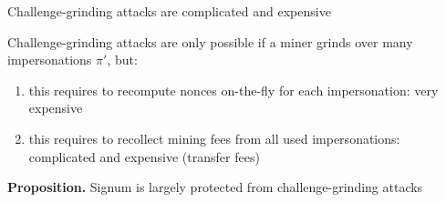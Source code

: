 \documentclass[11pt]{beamer}  %
\begin{document}
\begin{frame}{Challenge-grinding attacks are complicated and expensive}

  \begin{center}
  \end{center}

  Challenge-grinding attacks are only possible if a miner grinds over many impersonations $\pi'$, but:

  \begin{enumerate}
    \pause
  \item this requires to recompute nonces on-the-fly for each impersonation: very expensive
    \pause
  \item this requires to recollect mining fees from all used impersonations: complicated
    and expensive (transfer fees)
  \end{enumerate}

  \pause
  \begin{center}
    \textbf{Proposition.} Signum is largely protected from challenge-grinding attacks
  \end{center}

\end{frame}
\end{document}
